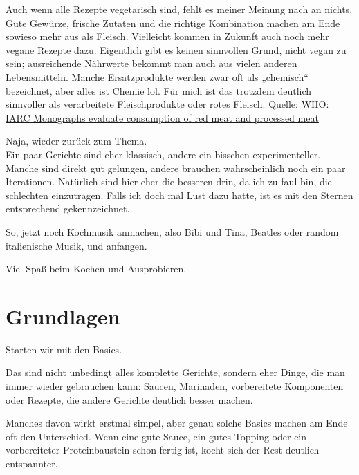 \documentclass[
a4paper,
11pt
]{article}
\begin{document}
Auch wenn alle Rezepte vegetarisch sind, fehlt es meiner Meinung nach an nichts. Gute Gewürze, frische Zutaten und die richtige Kombination machen am Ende sowieso mehr aus als Fleisch. Vielleicht kommen in Zukunft auch noch mehr vegane Rezepte dazu. Eigentlich gibt es keinen sinnvollen Grund, nicht vegan zu sein; ausreichende Nährwerte bekommt man auch aus vielen anderen Lebensmitteln. Manche Ersatzprodukte werden zwar oft als „chemisch“ bezeichnet, aber alles ist Chemie lol. Für mich ist das trotzdem deutlich sinnvoller als verarbeitete Fleischprodukte oder rotes Fleisch. Quelle:
\href{https://www.iarc.who.int/wp-content/uploads/2018/07/pr240_E.pdf}{WHO: IARC Monographs evaluate consumption of red meat and processed meat}

Naja, wieder zurück zum Thema.\\
Ein paar Gerichte sind eher klassisch, andere ein bisschen experimenteller. Manche sind direkt gut gelungen, andere brauchen wahrscheinlich noch ein paar Iterationen. Natürlich sind hier eher die besseren drin, da ich zu faul bin, die schlechten einzutragen. Falls ich doch mal Lust dazu hatte, ist es mit den Sternen entsprechend gekennzeichnet.

So, jetzt noch Kochmusik anmachen, also Bibi und Tina, Beatles oder random italienische Musik, und anfangen.

Viel Spaß beim Kochen und Ausprobieren.

\newpage
%



\section{Grundlagen}

Starten wir mit den Basics.

Das sind nicht unbedingt alles komplette Gerichte, sondern eher Dinge, die man immer wieder gebrauchen kann: Saucen, Marinaden, vorbereitete Komponenten oder Rezepte, die andere Gerichte deutlich besser machen.

Manches davon wirkt erstmal simpel, aber genau solche Basics machen am Ende oft den Unterschied. Wenn eine gute Sauce, ein gutes Topping oder ein vorbereiteter Proteinbaustein schon fertig ist, kocht sich der Rest deutlich entspannter.

\mylocaltableofcontents%
\newpage








\end{document}
